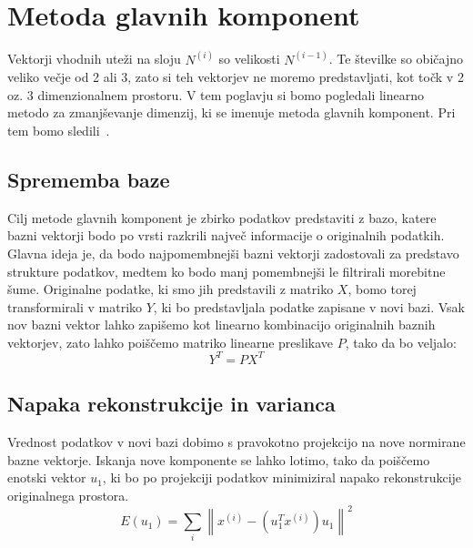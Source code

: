 \chapter{Metoda glavnih komponent}
Vektorji vhodnih uteži na sloju $N^{(i)}$ so velikosti $N^{(i - 1)}$. Te številke so običajno veliko večje od 2 ali 3, zato si teh vektorjev ne moremo predstavljati, kot točk v 2 oz. 3 dimenzionalnem prostoru. V tem poglavju si bomo pogledali linearno metodo za zmanjševanje dimenzij, ki se imenuje metoda glavnih komponent. Pri tem bomo sledili~\cite{shlens2014tutorial}.

\section{Sprememba baze}
Cilj metode glavnih komponent je zbirko podatkov predstaviti z bazo, katere bazni vektorji bodo po vrsti razkrili največ informacije o originalnih podatkih. Glavna ideja je, da bodo najpomembnejši bazni vektorji zadostovali za predstavo strukture podatkov, medtem ko bodo manj pomembnejši le filtrirali morebitne šume. Originalne podatke, ki smo jih predstavili z matriko $X$, bomo torej transformirali v matriko $Y$, ki bo predstavljala podatke zapisane v novi bazi. Vsak nov bazni vektor lahko zapišemo kot linearno kombinacijo originalnih baznih vektorjev, zato lahko poiščemo matriko linearne preslikave $P$, tako da bo veljalo:
\begin{equation}
  Y^T = PX^T
\end{equation}

\section{Napaka rekonstrukcije in varianca}
Vrednost podatkov v novi bazi dobimo s pravokotno projekcijo na nove normirane bazne vektorje. Iskanja nove komponente se lahko lotimo, tako da poiščemo enotski vektor $u_1$, ki bo po projekciji podatkov minimiziral napako rekonstrukcije originalnega prostora.
\begin{equation}
  E(u_1) = \sum_{i} \left\lVert x^{(i)} - (u_{1}^{T}{x}^{(i)})u_{1} \right\rVert^2
\end{equation}

